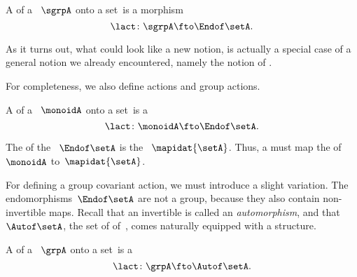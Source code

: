 \begin{ctdefinition}
    \label{def:semigroup-cov-action}
    A  of a ~$\sgrpA$ onto a set~\setA is a  morphism
    \begin{equation}
        \label{eq:act-semigroup}
        \lact \colon \sgrpA \fto \Endof\setA.
    \end{equation}
\end{ctdefinition}

As it turns out, what could look like a new notion, is actually a special case of a general notion we already encountered, namely the notion of .

For completeness, we also define  actions and group actions.

\begin{ctdefinition}
    \label{def:monoid-cov-action}
    A  of a ~$\monoidA$ onto a set~\setA is a 
    \begin{equation}
        \label{eq:act-monoid}
        \lact \colon \monoidA \fto \Endof\setA.
    \end{equation}
\end{ctdefinition}

The  of the ~$\Endof\setA$ is the ~$\mapidat{\setA}$.
Thus, a  must map the  of~$\monoidA$ to~$\mapidat{\setA}$.
%

For defining a group covariant action, we must introduce a slight variation.
The endomorphisms~$\Endof\setA$ are not a group, because they also contain non-invertible maps.
Recall that an invertible  is called an \emph{automorphism}, and that~$\Autof\setA$, the set of  of~\setA, comes naturally equipped with a  structure.


\begin{ctdefinition}
    \label{def:group-cov-action}
    A  of a ~$\grpA$ onto a set~\setA is a 
    \begin{equation}
        \label{eq:act-group}
        \lact \colon \grpA \fto \Autof\setA.
    \end{equation}
\end{ctdefinition}

